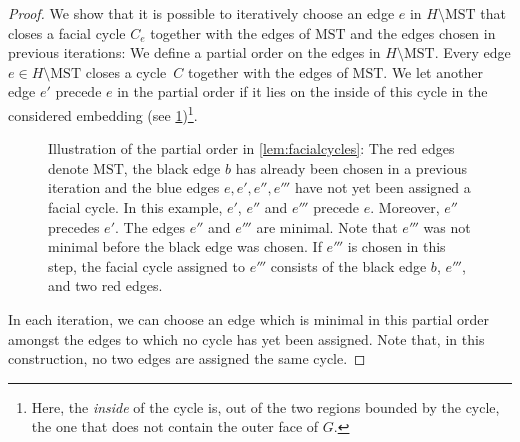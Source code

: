 \documentclass[a4paper,cleveref, autoref, thm-restate, thm-restate, UKenglish]{lipics-v2021}
\newcommand{\mst}{\mathrm{MST}}
\begin{document}
\begin{proof}
We show that it is possible to iteratively choose an edge $e$ in $H \setminus \mst$ that closes a facial cycle $C_e$ together with the edges of $\mst$ and the edges chosen in previous iterations:
We define a partial order on the edges in $H \setminus \mst$. Every edge $e \in H \setminus \mst$ closes a cycle~$C$ together with the edges of $\mst$. We let another edge $e'$ precede $e$ in the partial order if it lies on the inside of this cycle in the considered embedding (see \cref{fig:partialorder})\footnote{Here, the \emph{inside} of the cycle is, out of the two regions bounded by the cycle, the one that does not contain the outer face of $G$.}.
\begin{figure}
\begin{center}
\end{center}
\caption{Illustration of the partial order in \cref{lem:facialcycles}: The red edges denote $\mst$, the black edge $b$ has already been chosen in a previous iteration and the blue edges $e, e', e'', e'''$ have not yet been assigned a facial cycle. In this example, $e'$, $e''$ and $e'''$ precede $e$. Moreover, $e''$ precedes $e'$. The edges $e''$ and $e'''$ are minimal. Note that $e'''$ was not minimal before the black edge was chosen. If $e'''$ is chosen in this step, the facial cycle assigned to $e'''$ consists of the black edge $b$, $e'''$, and two red edges.}\label{fig:partialorder}
\end{figure}
In each iteration, we can choose an edge which is minimal in this partial order amongst the edges to which no cycle has yet been assigned.
Note that, in this construction, no two edges are assigned the same cycle.
\end{proof}
\end{document}
